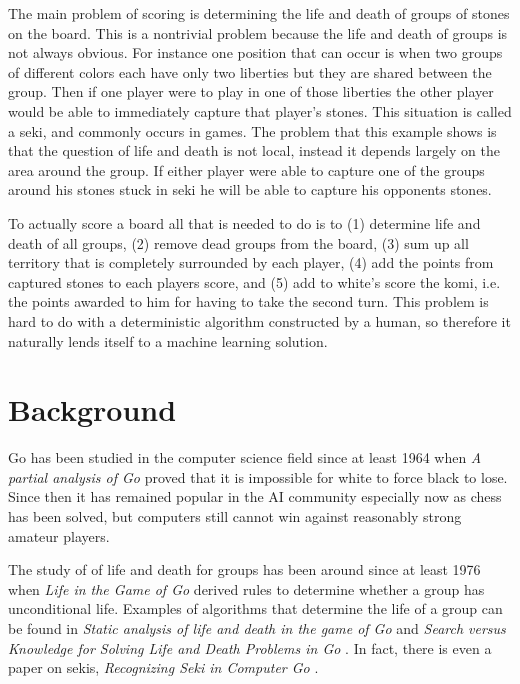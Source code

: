 \documentclass[11pt,letterpaper]{article}
\begin{document}
The main problem of scoring is determining the life and death of groups of stones on the board. This is a nontrivial
problem because the life and death of groups is not always obvious. For instance one position that can occur is
when two groups of different colors each have only two liberties but they are shared between the group. Then if one
player were to play in one of those liberties the other player would be able to immediately capture that player's
stones. This situation is called a seki, and commonly occurs in games. The problem that this example shows is that
the question of life and death is not local, instead it depends largely on the area around the group. If either player
were able to capture one of the groups around his stones stuck in seki he will be able to capture his opponents
stones.

To actually score a board all that is needed to do is to (1) determine life and death of all groups, (2) remove dead
groups from the board, (3) sum up all territory that is completely surrounded by each player, (4) add the points from
captured stones to each players score, and (5) add to white's score the komi, i.e. the points awarded to him for
having to take the second turn. This problem is hard to do with a deterministic algorithm constructed by a human,
so therefore it naturally lends itself to a machine learning solution.


\section{Background}

Go has been studied in the computer science field since at least 1964 when \emph{A partial analysis of Go}
\cite{TW:64} proved that it is impossible for white to force black to lose. Since then it has remained popular in the
AI community especially now as chess has been solved, but computers still cannot win against reasonably strong
amateur players.

The study of of life and death for groups has been around since at least 1976 when \emph{Life in the Game of Go}
\cite{B:76} derived rules to determine whether a group has unconditional life. Examples of algorithms that determine
the life of a group can be found in \emph{Static analysis of life and death in the game of Go} \cite{CC:99} and 
\emph{Search versus Knowledge for Solving Life and Death Problems in Go} \cite{KM:05}.
In fact, there is even a paper on sekis, \emph{Recognizing Seki in Computer Go} \cite{NKM:06}.
\end{document}

